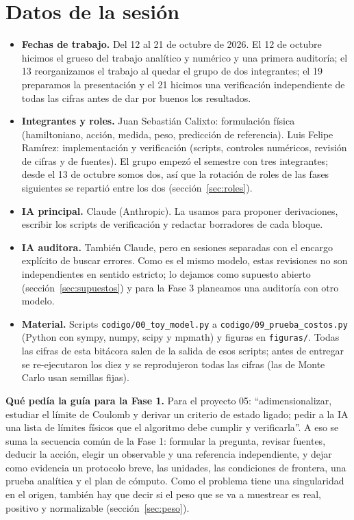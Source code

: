 \documentclass[11pt]{article}
\begin{document}
\section{Datos de la sesión}
\label{sec:datos}

\begin{itemize}
\item \textbf{Fechas de trabajo.} Del 12 al 21 de octubre de 2026. El 12 de octubre hicimos el grueso del trabajo analítico y numérico y una primera auditoría; el 13 reorganizamos el trabajo al quedar el grupo de dos integrantes; el 19 preparamos la presentación y el 21 hicimos una verificación independiente de todas las cifras antes de dar por buenos los resultados.
\item \textbf{Integrantes y roles.} Juan Sebastián Calixto: formulación física (hamiltoniano, acción, medida, peso, predicción de referencia). Luis Felipe Ramírez: implementación y verificación (scripts, controles numéricos, revisión de cifras y de fuentes). El grupo empezó el semestre con tres integrantes; desde el 13 de octubre somos dos, así que la rotación de roles de las fases siguientes se repartió entre los dos (sección~\ref{sec:roles}).
\item \textbf{IA principal.} Claude (Anthropic). La usamos para proponer derivaciones, escribir los scripts de verificación y redactar borradores de cada bloque.
\item \textbf{IA auditora.} También Claude, pero en sesiones separadas con el encargo explícito de buscar errores. Como es el mismo modelo, estas revisiones no son independientes en sentido estricto; lo dejamos como supuesto abierto (sección~\ref{sec:supuestos}) y para la Fase 3 planeamos una auditoría con otro modelo.
\item \textbf{Material.} Scripts \texttt{codigo/00\_toy\_model.py} a \texttt{codigo/09\_prueba\_costos.py} (Python con sympy, numpy, scipy y mpmath) y figuras en \texttt{figuras/}. Todas las cifras de esta bitácora salen de la salida de esos scripts; antes de entregar se re-ejecutaron los diez y se reprodujeron todas las cifras (las de Monte Carlo usan semillas fijas).
\end{itemize}

\textbf{Qué pedía la guía para la Fase 1.} Para el proyecto 05: ``adimensionalizar, estudiar el límite de Coulomb y derivar un criterio de estado ligado; pedir a la IA una lista de límites físicos que el algoritmo debe cumplir y verificarla''. A eso se suma la secuencia común de la Fase 1: formular la pregunta, revisar fuentes, deducir la acción, elegir un observable y una referencia independiente, y dejar como evidencia un protocolo breve, las unidades, las condiciones de frontera, una prueba analítica y el plan de cómputo. Como el problema tiene una singularidad en el origen, también hay que decir si el peso que se va a muestrear es real, positivo y normalizable (sección~\ref{sec:peso}).
\end{document}
